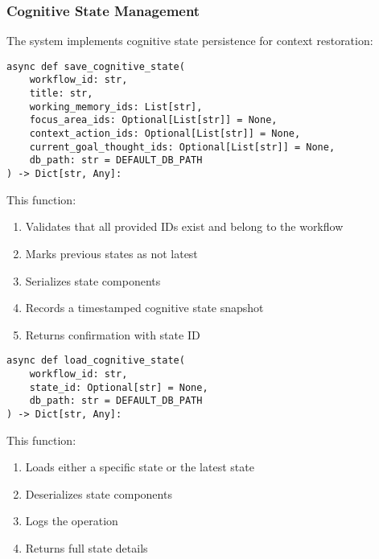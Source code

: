 \documentclass[12pt,a4paper]{article}
\begin{document}
\subsubsection*{Cognitive State Management}

The system implements cognitive state persistence for context restoration:
\begin{pageablecode}
\begin{verbatim}
async def save_cognitive_state(
    workflow_id: str,
    title: str,
    working_memory_ids: List[str],
    focus_area_ids: Optional[List[str]] = None,
    context_action_ids: Optional[List[str]] = None,
    current_goal_thought_ids: Optional[List[str]] = None,
    db_path: str = DEFAULT_DB_PATH
) -> Dict[str, Any]:
\end{verbatim}
\end{pageablecode}
This function:
\begin{enumerate}[label=\arabic*.]
    \item Validates that all provided IDs exist and belong to the workflow
    \item Marks previous states as not latest
    \item Serializes state components
    \item Records a timestamped cognitive state snapshot
    \item Returns confirmation with state ID
\end{enumerate}

\begin{pageablecode}
\begin{verbatim}
async def load_cognitive_state(
    workflow_id: str,
    state_id: Optional[str] = None,
    db_path: str = DEFAULT_DB_PATH
) -> Dict[str, Any]:
\end{verbatim}
\end{pageablecode}
This function:
\begin{enumerate}[label=\arabic*.]
    \item Loads either a specific state or the latest state
    \item Deserializes state components
    \item Logs the operation
    \item Returns full state details
\end{enumerate}
\end{document}
